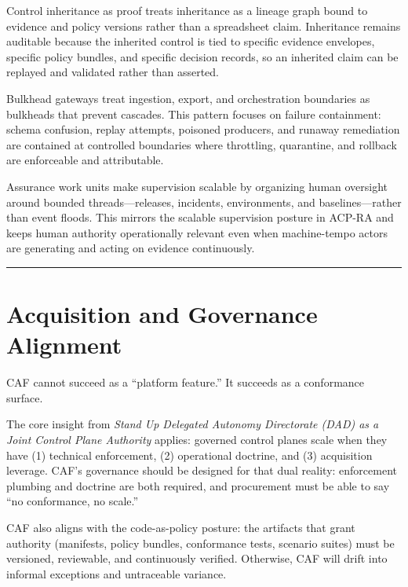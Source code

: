 \documentclass[11pt]{article}
\begin{document}
Control inheritance as proof treats inheritance as a lineage graph bound to evidence and policy versions rather than a spreadsheet claim. Inheritance remains auditable because the inherited control is tied to specific evidence envelopes, specific policy bundles, and specific decision records, so an inherited claim can be replayed and validated rather than asserted.

Bulkhead gateways treat ingestion, export, and orchestration boundaries as bulkheads that prevent cascades. This pattern focuses on failure containment: schema confusion, replay attempts, poisoned producers, and runaway remediation are contained at controlled boundaries where throttling, quarantine, and rollback are enforceable and attributable.

Assurance work units make supervision scalable by organizing human oversight around bounded threads---releases, incidents, environments, and baselines---rather than event floods. This mirrors the scalable supervision posture in ACP-RA and keeps human authority operationally relevant even when machine-tempo actors are generating and acting on evidence continuously. \cite{ACPRA}

\begin{center}\rule{0.5\linewidth}{0.5pt}\end{center}

\hypertarget{acquisition-and-governance-alignment}{%
\section{Acquisition and Governance Alignment}\label{acquisition-and-governance-alignment}}

CAF cannot succeed as a ``platform feature.'' It succeeds as a
conformance surface.

The core insight from \textit{Stand Up Delegated Autonomy Directorate (DAD) as a Joint Control Plane Authority} applies: governed control planes scale when they have (1) technical enforcement, (2) operational doctrine, and (3) acquisition leverage. CAF's governance should be designed for that dual reality: enforcement plumbing and doctrine are both required, and procurement must be able to say ``no conformance, no scale.'' \cite{DADMemo}

CAF also aligns with the code-as-policy posture: the artifacts that
grant authority (manifests, policy bundles, conformance tests, scenario
suites) must be versioned, reviewable, and continuously verified.
Otherwise, CAF will drift into informal exceptions and untraceable
variance. \cite{CodeAsPolicy}
\end{document}
